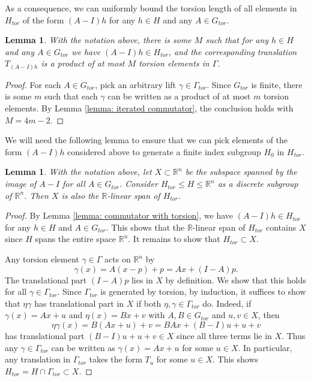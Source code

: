 \documentclass{amsart}
\newtheorem{lemma}[theorem]{Lemma}
\theoremstyle{definition}
\numberwithin{equation}{section}
\theoremstyle{theorem}
\theoremstyle{remark}
\def\R{\mathbb R}
\def\Gt{G_{tor}}
\def\Ht{H_{tor}}
\def\Gat{\Gamma_{tor}}
\begin{document}
	As a consequence, we can uniformly bound the torsion length of all elements in $\Ht$ of the form $(A-I)h$ for any $h\in H$ and any $A\in \Gt$.
	\begin{lemma}\label{lemma: uniform bound}
		With the notation above, there is some $M$ such that for any $h\in H$ and any $A\in \Gt$ we have $(A-I)h\in \Ht$, and the corresponding translation $T_{(A-I)h}$ is a product of at most $M$ torsion elements in $\Gamma$.
	\end{lemma}
	\begin{proof}
		For each $A\in \Gt$, pick an arbitrary lift $\gamma\in\Gat$. Since $\Gt$ is finite, there is some $m$ such that each $\gamma$ can be written as a product of at most $m$ torsion elements. By Lemma \ref{lemma: iterated commutator}, the conclusion holds with $M=4m-2$.
	\end{proof}
	
	We will need the following lemma to ensure that we can pick elements of the form $(A-I)h$ considered above to generate a finite index subgroup $H_0$ in $\Ht$.
	\begin{lemma}\label{lemma: full image}
		With the notation above, let $X\subset \R^n$ be the subspace spanned by the image of $A-I$ for all $A\in \Gt$. 
		Consider $\Ht\le H\le \R^n$ as a discrete subgroup of $\R^n$. Then $X$ is also the $\R$-linear span of $\Ht$.
	\end{lemma}
	\begin{proof}
		By Lemma \ref{lemma: commutator with torsion}, we have $(A-I)h\in \Ht$ for any $h\in H$ and $A\in \Gt$. 
		This shows that the $\R$-linear span of $\Ht$ contains $X$ since $H$ spans the entire space $\R^n$. It remains to show that $\Ht\subset X$.
		
		Any torsion element $\gamma\in \Gamma$ acts on $\R^n$ by $$\gamma(x)=A(x-p)+p=Ax+(I-A)p.$$ 
		The translational part $(I-A)p$ lies in $X$ by definition. We show that this holds for all $\gamma\in \Gat$.
		Since $\Gat$ is generated by torsion, by induction, it suffices to show that
		$\eta\gamma$ has translational part in $X$ if both $\eta,\gamma\in \Gat$ do.
		Indeed, if $\gamma(x)=Ax+u$ and $\eta(x)=Bx+v$ with $A,B\in \Gt$ and $u,v\in X$, then 
		$$\eta\gamma(x)=B(Ax+u)+v=BAx+(B-I)u+u+v$$ has translational part $(B-I)u+u+v\in X$
		since all three terms lie in $X$. Thus 
		any $\gamma\in\Gat$ can be written as $\gamma(x)=Ax+u$ for some $u\in X$.
		In particular, any translation in $\Gat$ takes the form $T_u$ for some $u\in X$.
		This shows $\Ht=H\cap \Gat\subset X$.
	\end{proof}
	
\end{document}

